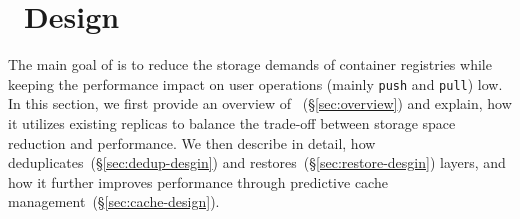 \section{\sysname~Design}
\label{sec:Sift}

%




The main goal of \sysname is to reduce the storage demands of container registries while
keeping the performance impact on user operations (mainly \texttt{push} and \texttt{pull})
low.
%
In this section, we first provide an overview of \sysname~(\S\ref{sec:overview}) and
explain, how it utilizes existing replicas to balance the trade-off between storage space reduction
and performance. We then describe in detail, how \sysname deduplicates~(\S\ref{sec:dedup-desgin})
and restores~(\S\ref{sec:restore-desgin}) layers, and how it further improves performance
through predictive cache management~(\S\ref{sec:cache-design}).



